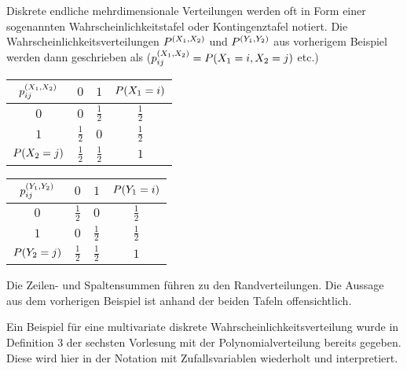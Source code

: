\documentclass{lecture}
\begin{document}
    \begin{example}
        Diskrete endliche mehrdimensionale Verteilungen werden oft in Form einer sogenannten Wahrscheinlichkeitstafel oder Kontingenztafel notiert.
        Die Wahrscheinlichkeitsverteilungen \(P^{\parentheses*{X_1, X_2}}\) und \(P^{\parentheses*{Y_1, Y_2}}\) aus vorherigem Beispiel werden dann geschrieben als (\(p_{ij}^{\parentheses*{X_1, X_2}} = P\parentheses*{X_1 = i, X_2 = j}\) etc.)
        \begin{center}
            \begin{tabular}{c|cc|c}
                \(p_{ij}^{\parentheses*{X_1, X_2}}\) & \(0\) & \(1\) & \(P\parentheses*{X_1 = i}\)\\
                \midrule
                \(0\) & \(0\) & \(\frac{1}{2}\) & \(\frac{1}{2}\)\\
                \(1\) & \(\frac{1}{2}\) & \(0\) & \(\frac{1}{2}\)\\
                \midrule
                \(P\parentheses*{X_2 = j}\) & \(\frac{1}{2}\) & \(\frac{1}{2}\) & \(1\)
            \end{tabular} \quad \begin{tabular}{c|cc|c}
                \(p_{ij}^{\parentheses*{Y_1, Y_2}}\) & \(0\) & \(1\) & \(P\parentheses*{Y_1 = i}\)\\
                \midrule
                \(0\) & \(\frac{1}{2}\) & \(0\) & \(\frac{1}{2}\)\\
                \(1\) & \(0\) & \(\frac{1}{2}\) & \(\frac{1}{2}\)\\
                \midrule
                \(P\parentheses*{Y_2 = j}\) & \(\frac{1}{2}\) & \(\frac{1}{2}\) & \(1\)
            \end{tabular}
        \end{center}
        Die Zeilen- und Spaltensummen führen zu den Randverteilungen.
        Die Aussage aus dem vorherigen Beispiel ist anhand der beiden Tafeln offensichtlich.
    \end{example}

    Ein Beispiel für eine multivariate diskrete Wahrscheinlichkeitsverteilung wurde in Definition 3 der sechsten Vorlesung mit der Polynomialverteilung bereits gegeben.
    Diese wird hier in der Notation mit Zufallsvariablen wiederholt und interpretiert.
\end{document}
